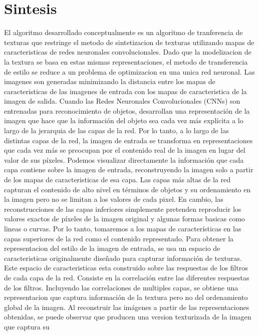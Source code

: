 \documentclass[a4paper,11pt,spanish]{book}
\begin{document}
    \section{Sintesis \label{sec:sintesis}}
      El algoritmo desarrollado conceptualmente es un algoritmo de tranferencia de texturas que restringe el metodo de sintetizacion de texturas utilizando mapas de caracteristicas
      de redes neuronales convolucionales. Dado que la modelizacion de la textura se basa en estas mismas representaciones, el metodo de transferencia de estilo se reduce a un problema
      de optimizacion en una unica red neuronal. Las imagenes son generadas minimizando la distancia entre los mapas de caracteristicas de las imagenes de entrada con los mapas de
      caracteristica de la imagen de salida.
      Cuando las Redes Neuronales Convolucionales (CNNs) son entrenadas para reconocimiento de objetos, desarrollan una representación de la imagen que hace que la información
      del objeto sea cada vez más explícita a lo largo de la jerarquia de las capas de la red. Por lo tanto, a lo largo de las distintas capas de la red,
      la imagen de entrada se transforma en representaciones que cada vez más se preocupan por el contenido real de la imagen en lugar del valor de sus píxeles.
      Podemos visualizar directamente la información que cada capa contiene sobre la imagen de entrada, reconstruyendo la imagen solo a partir de los mapas de caracteristicas
      de esa capa. Las capas más altas de la red capturan el contenido de alto nivel en términos de objetos y su ordenamiento en la imagen pero no se limitan a los valores de cada
      pixel. En  cambio, las reconstrucciones de las capas inferiores simplemente pretenden reproducir los valores exactos de píxeles de la imagen original y algunas formas
      basicas como lineas o curvas. Por lo tanto, tomaremos a los mapas de características en las capas superiores de la red como el contenido representado.
      Para obtener la representacion del estilo de la imagen de entrada, se usa un espacio de caracteristicas originalmente diseñado para capturar información de texturas.
      Este espacio de caracteristicas esta construido sobre las respuestas de los filtros de cada capa de la red. Consiste en la correlación entre las diferentes respuestas de los filtros.
      Incluyendo las correlaciones de multiples capas, se obtiene una representacion que captura información de la textura pero no del ordenamiento global de la imagen.
      Al reconstruir las imágenes a partir de las representaciones obtenidas, se puede observar que producen una version texturizada de la imagen que captura su
\end{document}
